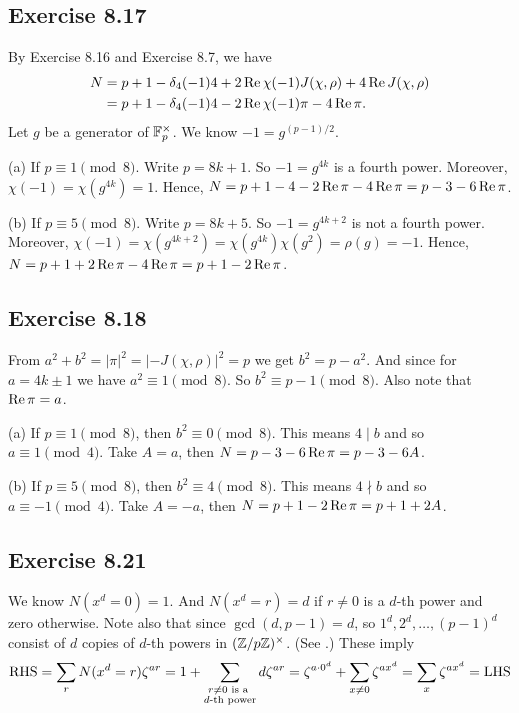 \documentclass[../I&R.tex]{subfiles}
\begin{document}
\subsection*{Exercise 8.17}

By Exercise 8.16 and Exercise 8.7, we have
\begin{align*}
    N &= p+1-\delta_4(-1)4+2\operatorname{Re}\chi(-1)J(\chi,\rho)+4\operatorname{Re} J(\chi,\rho) \\
    &= p+1-\delta_4(-1)4-2\operatorname{Re}\chi(-1)\pi-4\operatorname{Re}\pi.
\end{align*}
Let $g$ be a generator of $\mathbb{F}_p^\times$. We know $-1=g^{(p-1)/2}$.

(a) If $p\equiv1\pmod{8}$. Write $p=8k+1$. So $-1=g^{4k}$ is a fourth power. Moreover, $\chi(-1)=\chi(g^{4k})=1$. Hence, $N=p+1-4-2\operatorname{Re}\pi-4\operatorname{Re}\pi=p-3-6\operatorname{Re}\pi$.

(b) If $p\equiv5\pmod{8}$. Write $p=8k+5$. So $-1=g^{4k+2}$ is not a fourth power. Moreover, $\chi(-1)=\chi(g^{4k+2})=\chi(g^{4k})\chi(g^2)=\rho(g)=-1$. Hence, $N=p+1+2\operatorname{Re}\pi-4\operatorname{Re}\pi=p+1-2\operatorname{Re}\pi$.

\subsection*{Exercise 8.18}

From $a^2+b^2=|\pi|^2=|-J(\chi,\rho)|^2=p$ we get $b^2=p-a^2$. And since for $a=4k\pm1$ we have $a^2\equiv1\pmod{8}$. So $b^2\equiv p-1\pmod{8}$. Also note that $\operatorname{Re}\pi=a$.

(a) If $p\equiv1\pmod{8}$, then $b^2\equiv0\pmod{8}$. This means $4\mid b$ and so $a\equiv 1\pmod{4}$. Take $A=a$, then $N=p-3-6\operatorname{Re}\pi=p-3-6A$.

(b) If $p\equiv5\pmod{8}$, then $b^2\equiv4\pmod{8}$. This means $4\nmid b$ and so $a\equiv-1\pmod{4}$. Take $A=-a$, then $N=p+1-2\operatorname{Re}\pi=p+1+2A$.

\subsection*{Exercise 8.21}

We know $N(x^d=0)=1$. And $N(x^d=r)=d$ if $r\neq0$ is a $d$-th power and zero otherwise. Note also that since $\gcd(d,p-1)=d$, so $1^d,2^d,\ldots,(p-1)^d$ consist of $d$ copies of $d$-th powers in $(\mathbb{Z}/p\mathbb{Z})^\times$. (See .) These imply $$\operatorname{RHS}=\sum_r N(x^d=r)\zeta^{ar} = 1+\sum_{\substack{r\neq0 \text{ is a } \\ d\text{-th power}}} d\zeta^{ar} = \zeta^{a\cdot0^d} + \sum_{x\neq0} \zeta^{ax^d} = \sum_x \zeta^{ax^d} = \operatorname{LHS}$$
\end{document}
